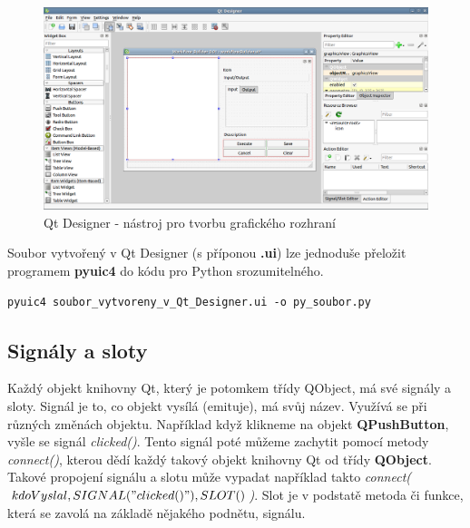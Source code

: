 \begin{figure}[h]
	\centering
	\includegraphics[scale=0.35]{pictures/qt/qt_designer}
	\caption{Qt Designer - nástroj pro tvorbu grafického rozhraní}
  	\label{qtdesigner}
\end{figure}

Soubor vytvořený v Qt Designer (s příponou \textbf{.ui}) lze jednoduše přeložit programem \textbf{pyuic4} do kódu pro Python srozumitelného. \\

\begin{lstlisting}[label=pyuic4,caption={pyuic4 - přeložení .ui souboru do pythoního kódu},morekeywords={pyuic4}]
		pyuic4 soubor_vytvoreny_v_Qt_Designer.ui -o py_soubor.py 
\end{lstlisting}

\newpage
\subsection{Signály a sloty}
Každý objekt knihovny Qt, který je potomkem třídy QObject, má své
signály a sloty. Signál je to, co objekt vysílá (emituje), má svůj
název. Využívá se při různých změnách objektu. Například když klikneme
na objekt \textbf{QPushButton}, vyšle se
signál \textit{clicked()}. Tento signál poté můžeme zachytit pomocí
metody \textit{connect()}, kterou dědí každý takový objekt knihovny Qt
od třídy \textbf{QObject}. Takové propojení signálu a slotu může
vypadat například
takto \textit{connect($kdoVyslal,SIGNAL("clicked()"), SLOT()$)}. Slot
je v podstatě metoda či funkce, která se zavolá na základě nějakého
podnětu, signálu.

